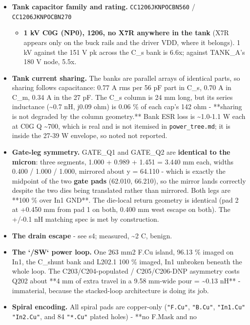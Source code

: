 \documentclass[11pt,a4paper]{article}
\begin{document}
\begin{itemize}
\item \textbf{Tank capacitor family and rating.} \texttt{CC1206JKNPOCBN560} / \texttt{CC1206JKNPOCBN270}
\begin{itemize}
\item \textbf{1 kV C0G (NP0), 1206, no X7R anywhere in the tank} (X7R appears only on
the buck rails and the driver VDD, where it belongs). 1 kV against the 151 V
pk across the C\_s bank is 6.6x; against TANK\_A's 180 V node, 5.5x.
\end{itemize}
\item \textbf{Tank current sharing.} The banks are parallel arrays of identical parts, so
sharing follows capacitance: 0.77 A rms per 56 pF part in C\_s, 0.70 A in C\_m,
0.34 A in the 27 pF. The C\_s column is 24 mm long, but its series inductance
(\textasciitilde{}0.7 nH, j0.09 ohm) is 0.06 \% of each cap's 142 ohm - {*}{*}sharing is not
degraded by the column geometry.{*}{*} Bank ESR loss is \textasciitilde{}1.0-1.1 W each at C0G
Q \textasciitilde{}700, which is real and is not itemised in \texttt{power\_tree.md}; it is inside the
27-39 W envelope, so noted not reported.
\item \textbf{Gate-leg symmetry.} GATE\_Q1 and GATE\_Q2 are \textbf{identical to the micron}:
three segments, 1.000 + 0.989 + 1.451 = 3.440 mm each, widths 0.400 / 1.000 /
1.000, mirrored about y = 64.110 - which is exactly the midpoint of the two
\textbf{gate pads} (62.010, 66.210), so the mirror lands correctly despite the two
dies being translated rather than mirrored. Both legs are {*}{*}100 \% over In1
GND{*}{*}. The die-local return geometry is identical (pad 2 at +0.450 mm from
pad 1 on both, 0.400 mm west escape on both). The +/-0.1 nH matching spec is
met by construction.
\item \textbf{The drain escape} - see s4; measured, \textasciitilde{}2 C, benign.
\item \textbf{The `/SW` power loop.} One 263 mm2 F.Cu island, 96.13 \% imaged on In1, the
C\_shunt bank and L202.1 100 \% imaged, In1 unbroken beneath the whole loop.
The C203/C204-populated / C205/C206-DNP asymmetry costs Q202 about {*}{*}4 mm of
extra travel in a 9.58 mm-wide pour = \textasciitilde{}0.13 nH{*}{*} - immaterial, because the
stacked-loop architecture is doing its job.
\item \textbf{Spiral encoding.} All spiral pads are copper-only (\texttt{"F.Cu"}, \texttt{"B.Cu"},
\texttt{"In1.Cu" "In2.Cu"}, and 84 \texttt{"{*}.Cu"} plated holes) - {*}{*}no F.Mask and no

\end{itemize}
\end{document}
